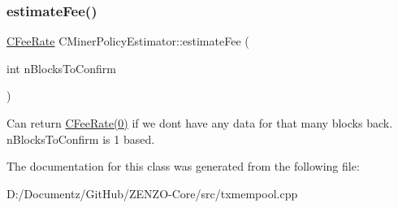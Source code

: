 \subsubsection{\texorpdfstring{estimateFee()}{estimateFee()}}
{\footnotesize\ttfamily \mbox{\hyperlink{class_c_fee_rate}{C\+Fee\+Rate}} C\+Miner\+Policy\+Estimator\+::estimate\+Fee (\begin{DoxyParamCaption}\item[{int}]{n\+Blocks\+To\+Confirm }\end{DoxyParamCaption})\hspace{0.3cm}{\ttfamily [inline]}}

Can return \mbox{\hyperlink{class_c_fee_rate}{C\+Fee\+Rate(0)}} if we don\textquotesingle{}t have any data for that many blocks back. n\+Blocks\+To\+Confirm is 1 based. 

The documentation for this class was generated from the following file\+:\begin{DoxyCompactItemize}
\item 
D\+:/\+Documentz/\+Git\+Hub/\+Z\+E\+N\+Z\+O-\/\+Core/src/txmempool.\+cpp\end{DoxyCompactItemize}
